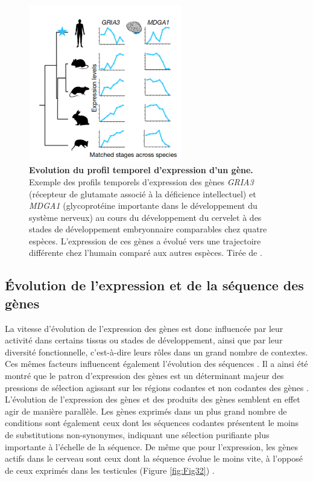 \begin{figure}[h]
 \centering
 \includegraphics[width=0.6\textwidth, page=1] {figures/introduction/fig31.png}
 \caption[Evolution du profil temporel d'expression d'un gène.]{
 \textbf{Evolution du profil temporel d'expression d'un gène.}
 Exemple des profils temporels d'expression des gènes \textit{GRIA3} (récepteur de glutamate associé à la déficience intellectuel) et \textit{MDGA1} (glycoprotéine importante dans le développement du système nerveux) au cours du développement du cervelet à des stades de développement embryonnaire comparables chez quatre espèces. L'expression de ces gènes a évolué vers une trajectoire différente chez l'humain comparé aux autres espèces. Tirée de \citet{cardoso-moreira_gene_2019}. \\
 }
 \label{fig:Fig31}
\end{figure}

\subsection{\'Evolution de l’expression et de la séquence des gènes}
\label{sub:evol-exp-seq}

La vitesse d’évolution de l’expression des gènes est donc influencée par leur activité dans certains tissus ou stades de développement, ainsi que par leur diversité fonctionnelle, c’est-à-dire leurs rôles dans un grand nombre de contextes. Ces mêmes facteurs influencent également l’évolution des séquences \citep{kuma_functional_1995,hastings_strong_1996}. Il a ainsi été montré que le patron d’expression des gènes est un déterminant majeur des pressions de sélection agissant sur les régions codantes et non codantes des gènes \citep{duret_determinants_2000}. L’évolution de l’expression des gènes et des produits des gènes semblent en effet agir de manière parallèle. Les gènes exprimés dans un plus grand nombre de \glspl{condition} sont également ceux dont les séquences codantes présentent le moins de substitutions non-synonymes, indiquant une sélection purifiante plus importante à l’échelle de la séquence. De même que pour l’expression, les gènes actifs dans le cerveau sont ceux dont la séquence évolue le moins vite, à l’opposé de ceux exprimés dans les testicules (Figure \ref{fig:Fig32}) \citep{khaitovich_parallel_2005}. \\

